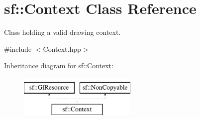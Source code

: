 \hypertarget{classsf_1_1_context}{}\section{sf\+:\+:Context Class Reference}
\label{classsf_1_1_context}


Class holding a valid drawing context.  




{\ttfamily \#include $<$Context.\+hpp$>$}

Inheritance diagram for sf\+:\+:Context\+:\begin{figure}[H]
\begin{center}
\leavevmode
\includegraphics[height=2.000000cm]{classsf_1_1_context}
\end{center}
\end{figure}
